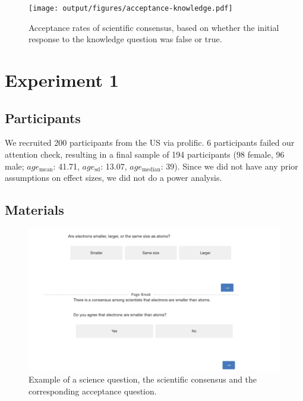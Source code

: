 \documentclass[
  doc,floatsintext]{apa6}
\begin{document}
\begin{figure}
\centering
\texttt{[image: output/figures/acceptance-knowledge.pdf]}
\caption{\label{fig:acceptance-knowledge}Acceptance rates of scientific consensus, based on whether the initial response to the knowledge question was false or true.}
\end{figure}

\clearpage

\section{Experiment 1}\label{exp1}

\subsection{Participants}\label{participants-1}

We recruited 200 participants from the US via prolific. 6 participants failed our attention check, resulting in a final sample of 194 participants (98 female, 96 male; \(age_\text{mean}\): 41.71, \(age_\text{sd}\): 13.07, \(age_\text{median}\): 39). Since we did not have any prior assumptions on effect sizes, we did not do a power analysis.

\subsection{Materials}\label{materials-2}

\FloatBarrier



\begin{figure}

\includegraphics[width=1\linewidth]{./figures/study1_question_example} \hfill{}

\caption{Example of a science question, the scientific consensus and the corresponding acceptance question.}\label{fig:stimulus-example}
\end{figure}
\end{document}
